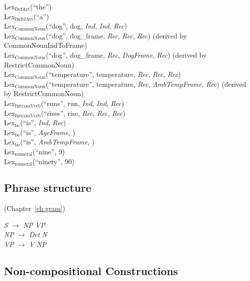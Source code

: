 Lex$_{\mathrm{DefArt}}$(``the'') \\
Lex$_{\mathrm{IndefArt}}$(``a'') \\
Lex$_{\mathrm{CommonNoun}}$(``dog'', dog, \textit{Ind},
  \textit{Ind}, \textit{Rec})\\
Lex$_{\mathrm{CommonNoun}}$(``dog'', dog\_frame, \textit{Rec},
  \textit{Rec}, \textit{Rec}) (derived by CommonNounIndToFrame) \\
Lex$_{\mathrm{CommonNoun}}$(``dog'', dog\_frame, \textit{Rec},
  \textit{DogFrame}, \textit{Rec}) (derived by RestrictCommonNoun) \\
Lex$_{\mathrm{CommonNoun}}$(``temperature'', temperature,
      \textit{Rec}, \textit{Rec}, \textit{Rec}) \\
Lex$_{\mathrm{CommonNoun}}$(``temperature'', temperature,
      \textit{Rec}, \textit{AmbTempFrame}, \textit{Rec}) (derived by
      RestrictCommonNoun) \\
Lex$_{\mathrm{IntransVerb}}$(``runs'', run, \textit{Ind},
  \textit{Ind}, \textit{Rec})\\
Lex$_{\mathrm{IntransVerb}}$(``rises'', rise,
      \textit{Rec}, \textit{Rec}, \textit{Rec})  \\
Lex$_{\mathrm{be}}$(``is'', \textit{Ind}, \textit{Rec}) \\
Lex$_{\mathrm{be}}$(``is'', \textit{AgeFrame},
)
\\
Lex$_{\mathrm{be}}$(``is'', \textit{AmbTempFrame},
)
\\
Lex$_{\mathrm{numeral}}$(``nine'', 9) \\
Lex$_{\mathrm{numeral}}$(``ninety'', 90)


\subsection{Phrase structure}

(Chapter~\ref{ch:gram})

\textit{S} $\longrightarrow$ \textit{NP} \textit{VP} \\
\textit{NP} $\longrightarrow$ \textit{Det} \textit{N} \\
\textit{VP} $\longrightarrow$ \textit{V} \textit{NP}

\subsection{Non-compositional Constructions}

